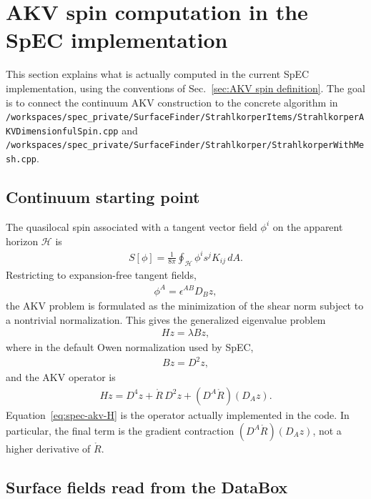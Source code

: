 
\section{\label{sec:spec-akv-computations}AKV spin computation in the SpEC implementation}

This section explains what is actually computed in the current SpEC implementation, using the conventions of Sec.~\ref{sec:AKV spin definition}.  The goal is to connect the continuum AKV construction to the concrete algorithm in
\texttt{/workspaces/spec\_private/SurfaceFinder/StrahlkorperItems/StrahlkorperAKVDimensionfulSpin.cpp}
and
\texttt{/workspaces/spec\_private/SurfaceFinder/Strahlkorper/StrahlkorperWithMesh.cpp}.

\subsection{Continuum starting point}

The quasilocal spin associated with a tangent vector field $\phi^i$ on the apparent horizon $\mathcal{H}$ is
\begin{align}
S[\phi] = \frac{1}{8\pi}\oint_{\mathcal H} \phi^i s^j K_{ij}\, dA.
\end{align}
Restricting to expansion-free tangent fields,
\begin{align}
\phi^A = \epsilon^{AB} D_B z,
\end{align}
the AKV problem is formulated as the minimization of the shear norm subject to a nontrivial normalization.  This gives the generalized eigenvalue problem
\begin{align}
H z = \lambda B z,
\end{align}
where in the default Owen normalization used by SpEC,
\begin{align}
B z = D^2 z,
\end{align}
and the AKV operator is
\begin{align}
H z = D^4 z + \mathring{R}\, D^2 z + (D^A \mathring{R})(D_A z).
\label{eq:spec-akv-H}
\end{align}
Equation~\eqref{eq:spec-akv-H} is the operator actually implemented in the code.  In particular, the final term is the gradient contraction
$(D^A \mathring{R})(D_A z)$, not a higher derivative of $\mathring{R}$.

\subsection{Surface fields read from the DataBox}

